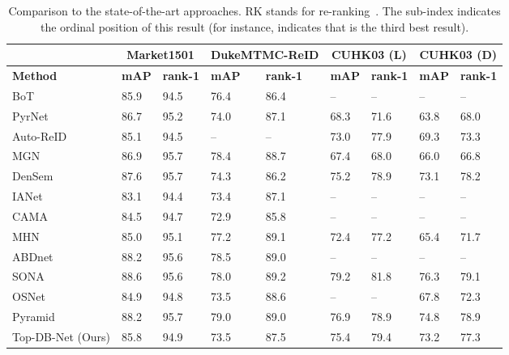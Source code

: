 \documentclass[a4paper,conference]{IEEEtran}
\begin{document}
\begin{table*}[!htb]
\renewcommand{\arraystretch}{0.86}
  \setlength{\tabcolsep}{2.5mm}
  \centering
  \caption{Comparison to the state-of-the-art approaches. RK stands for re-ranking~\cite{zhong2017re}. The sub-index indicates the ordinal position of this result (for instance,  indicates that  is the third best result).}
  \label{table:comparison-state-of-art}
  \begin{tabular}{lllllllll}
  \toprule
  & \multicolumn{2}{c}{\textbf{Market1501}} & \multicolumn{2}{c}{\textbf{DukeMTMC-ReID}}& \multicolumn{2}{c}{\textbf{CUHK03 (L)}} & \multicolumn{2}{c}{\textbf{CUHK03 (D)}} \\
  \midrule
  \textbf{Method} & \textbf{mAP} & \textbf{rank-1} & \textbf{mAP} & \textbf{rank-1} & \textbf{mAP} & \textbf{rank-1} & \textbf{mAP} & \textbf{rank-1} \\
  \midrule
  BoT~\cite{luo2019bag}                 & 85.9 & 94.5     & 76.4     & 86.4     &  --      &  --      &  --      &  --      \\
  PyrNet~\cite{martinel2019aggregating} & 86.7     & 95.2 & 74.0     & 87.1     & 68.3     & 71.6     & 63.8     & 68.0     \\
  Auto-ReID~\cite{quan2019auto}         & 85.1     & 94.5     &  --      &  --      & 73.0     & 77.9     & 69.3     & 73.3     \\
  MGN~\cite{wang2018learning}           & 86.9 & 95.7 & 78.4 & 88.7 & 67.4     & 68.0     & 66.0     & 66.8     \\
  DenSem~\cite{Zhang_2019_CVPR}         & 87.6 & 95.7 & 74.3     & 86.2     & 75.2     & 78.9     & 73.1     & 78.2 \\
  IANet~\cite{hou2019interaction}       & 83.1     & 94.4     & 73.4     & 87.1     &  --      &  --      &  --      & --       \\
  CAMA~\cite{yang2019towards}           & 84.5     & 94.7     & 72.9     & 85.8     &  --      &  --      &  --      & --       \\
  MHN~\cite{chen2019mixed}              & 85.0     & 95.1 & 77.2     & 89.1 & 72.4     & 77.2     & 65.4     & 71.7     \\
  ABDnet~\cite{chen2019abd}             & 88.2 & 95.6 & 78.5 & 89.0 &  --      &  --      &  --      & --       \\
  SONA~\cite{xia2019second}             & 88.6 & 95.6 & 78.0     & 89.2 & 79.2 & 81.8 & 76.3 & 79.1 \\
  OSNet~\cite{zhou2019osnet}            & 84.9     & 94.8     & 73.5     & 88.6 &  --      &  --      & 67.8     & 72.3     \\
  Pyramid~\cite{zheng2019pyramidal}     & 88.2 & 95.7 & 79.0 & 89.0 & 76.9 & 78.9     & 74.8 & 78.9 \\
  Top-DB-Net (Ours)                    & 85.8 & 94.9 & 73.5     & 87.5 & 75.4 & 79.4 & 73.2 & 77.3 \\
 

\end{tabular}
\end{table*}
\end{document}
